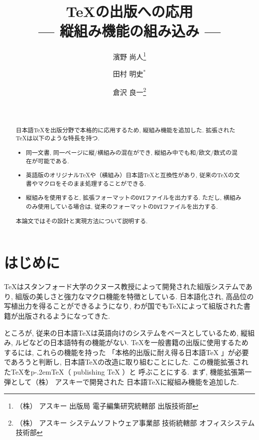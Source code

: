 

\title{\TeX の出版への応用\\
	\large--- 縦組み機能の組み込み ---}
\author{濱野 尚人\thanks{（株）\kern-2pt アスキー %
		出版局 電子編集研究統轄部 出版技術部}
	\and 田村 明史${}^*$
	\and 倉沢 良一\thanks{（株）\kern-2pt アスキー %
		システムソフトウェア事業部 技術統轄部 オフィスシステム技術部}}
\date{\ }

\setlength{\unitlength}{0.1in}

\def\angle#1{$\langle{}$#1${}\rangle$}
\def\pTeX{p\kern-.2em\TeX}



\maketitle \thispagestyle{empty}

\begin{abstract}
日本語\TeX を出版分野で本格的に応用するため, 縦組み機能を追加した.
拡張された\TeX は以下のような特長を持つ.
\begin{itemize}
\item 同一文書, 同一ページに縦/横組みの混在ができ,
	縦組み中でも和/欧文/数式の混在が可能である.
\item 英語版のオリジナル\TeX や（横組み）日本語\TeX と互換性があり,
	従来の\TeX の文書やマクロをそのまま処理することができる.
\item 縦組みを使用すると, 拡張フォーマットの{\tt DVI}ファイルを出力する.
	ただし, 横組みのみ使用している場合は,
	従来のフォーマットの{\tt DVI}ファイルを出力する.
\end{itemize}
本論文ではその設計と実現方法について説明する.
\end{abstract}



\section{はじめに}

\TeX はスタンフォード大学のクヌース教授によって開発された組版システムであり,
組版の美しさと強力なマクロ機能を特徴としている.
日本語化され\cite{jtex}, 高品位の写植出力を得ることができるようになり,
わが国でも\TeX によって組版された書籍が出版されるようになってきた.

ところが, 従来の日本語\TeX は英語向けのシステムをベースとしているため,
縦組み, ルビなどの日本語特有の機能がない.
\TeX を一般書籍の出版に使用するためするには, これらの機能を持った
「本格的出版に耐え得る日本語\TeX\kern0pt 」が必要であろうと判断し,
日本語\TeX の改造に取り組むことにした.
この機能拡張された\TeX を\pTeX （\kern0pt publishing \TeX\kern0pt ）と
呼ぶことにする.
まず, 機能拡張第一弾として（株）\kern-3pt アスキーで開発された
日本語\TeX に縦組み機能を追加した.

